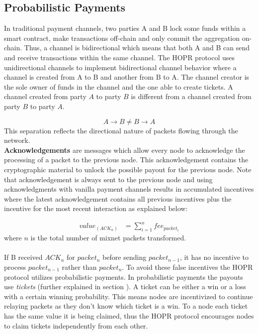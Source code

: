 \subsection{Probabilistic Payments}

In traditional payment channels, two parties A and B lock some funds within a
smart contract, make transactions off-chain and only commit the aggregation
on-chain. Thus, a channel is bidirectional which means that both A and B can
send and receive transactions within the same channel. The HOPR protocol uses
unidirectional channels to implement bidirectional channel behavior where a channel is created from A to B and another from B to A. 
The channel creator is the sole owner of funds in the channel and the one able to create tickets. A channel created from
party $A$ to party $B$ is different from a channel created from party $B$ to
party $A$.

 $$A\rightarrow B \neq B\rightarrow A$$
This separation reflects the directional nature of packets flowing through the
network.
\\\textbf{Acknowledgements} are messages which allow every node to acknowledge the
processing of a packet to the previous node. This acknowledgement contains the
cryptographic material to unlock the possible payout for the previous node. Note
that acknowledgement is always sent to the previous node and using acknowledgments with vanilla payment channels results in accumulated incentives where the latest acknowledgement contains all previous incentives plus the incentive for the most recent interaction as explained below:

\begin{align}
value_(ACK_n) &=\sum_{i=1}^nfee_{packet_i}
\end{align}
where $n$ is the total number of mixnet packets transformed.
\\~\\If B received $ACK_n$ for $packet_n$ before sending $packet_{n-1}$, it has no
incentive to process $packet_{n-1}$ rather than $packet_{n}$. To avoid these
false incentives the HOPR protocol utilizes probabilistic payments.
In probabilistic payments the payouts use \textit{tickets} (further explained in
section ). A ticket can be either a win or a loss with a
certain winning probability. This means nodes are incentivized to continue
relaying packets as they don’t know which ticket is a win. To a node each
ticket has the same value it is being claimed, thus the HOPR protocol
encourages nodes to claim tickets independently from each other.


